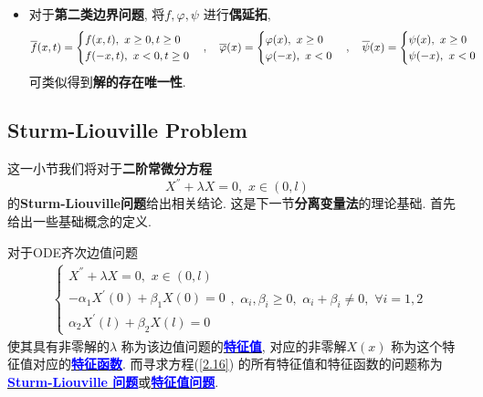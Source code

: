 \begin{thm}
\begin{rmk}
\begin{itemize}
				\vspace*{2em}
				
				\item 对于\textbf{第二类边界问题}, 将$f , \varphi , \psi$ 进行\textbf{偶延拓}, 
				\begin{align*}
					\overline{f}(x , t) = 
					\begin{cases}
						f(x  ,t) , \,\, x \geq 0 , t \geq 0 \\
						f(-x , t) , \,\, x < 0 , t \geq 0
					\end{cases} , \hspace*{1em}
					\overline{\varphi}(x) = 
					\begin{cases}
						\varphi(x) , \,\, x \geq 0 \\
						\varphi(-x) , \,\, x < 0
					\end{cases} , \hspace*{1em}
					\overline{\psi}(x) = 
					\begin{cases}
						\psi(x) , \,\, x \geq 0 \\
						\psi(-x) , \,\, x < 0
					\end{cases}
				\end{align*}
				可类似得到\textbf{解的存在唯一性}. 
			\end{itemize}
		\end{rmk}
	\end{thm}

\newpage

\subsection{Sturm-Liouville Problem}
	这一小节我们将对于\textbf{二阶常微分方程}
	\[ X^{''} + \lambda X = 0 , \,\, x \in (0 , l) \]
	的\textbf{Sturm-Liouville问题}给出相关结论. 这是下一节\textbf{分离变量法}的理论基础. 首先给出一些基础概念的定义. 
	
	\vspace*{1em}
	
	\begin{defn}\label{def 2.3.2}
		对于ODE齐次边值问题 
		\begin{align}
			\begin{cases}
				X^{''} + \lambda X = 0 , \,\, x \in (0 , l) \\
				-\alpha_1 X^{'}(0) + \beta_1 X(0) = 0 \\
				\alpha_2 X^{'}(l) + \beta_2 X(l) = 0
			\end{cases} , \,\, 
			\alpha_i , \beta_i \geq 0 , \,\, \alpha_i + \beta_i \neq 0 , \,\, \forall i = 1 , 2 \label{2.16}
		\end{align}
		使其具有非零解的$\lambda$ 称为该边值问题的\underline{\textcolor{blue}{\textbf{特征值}}}, 对应的非零解$X(x)$ 称为这个特征值对应的\underline{\textcolor{blue}{\textbf{特征函数}}}. 而寻求方程(\ref{2.16}) 的所有特征值和特征函数的问题称为\underline{\textcolor{blue}{\textbf{Sturm-Liouville 问题}}}或\underline{\textcolor{blue}{\textbf{特征值问题}}}. 
	\end{defn}
	
